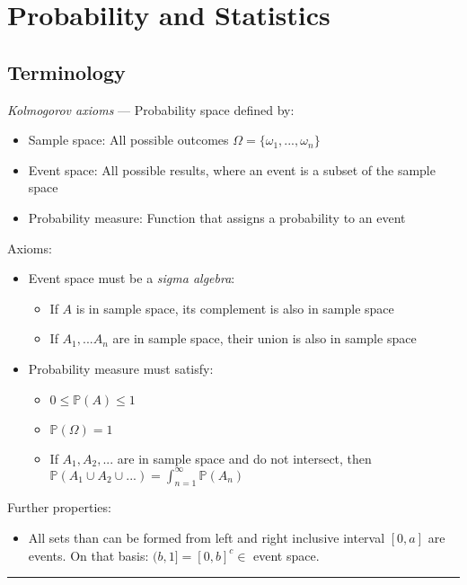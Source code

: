 \section{Probability and Statistics}
\subsection*{Terminology}
\emph{Kolmogorov axioms} --- 
Probability space defined by:
\begin{itemize}
    \item Sample space: All possible outcomes $\Omega = \{\omega_1,...,\omega_n\}$
    \item Event space: All possible results, where an event is a subset of the sample space 
    \item Probability measure: Function that assigns a probability to an event 
\end{itemize}
Axioms:
\begin{itemize}
    \item Event space must be a \emph{sigma algebra}:
    \begin{itemize}
        \item If $A$ is in sample space, its complement is also in sample space
        \item If $A_1,...A_n$ are in sample space, their union is also in sample space
    \end{itemize}
    \item Probability measure must satisfy:
    \begin{itemize}
        \item $0 \leq \mathbb{P}(A) \leq 1$
        \item $\mathbb{P}({\Omega}) = 1$
        \item If $A_1,A_2,...$ are in sample space and do not intersect, then $\mathbb{P}(A_1 \cup A_2 \cup ...) = \int_{n=1}^{\infty} \mathbb{P}(A_n)$
    \end{itemize}
\end{itemize}
Further properties:
\begin{itemize}
    \item All sets than can be formed from left and right inclusive interval $[0,a]$ are events. On that basis: $(b,1] = [0,b]^c \in$ event space.
\end{itemize}

{\color{lightgray}\hrule height 0.001mm}


